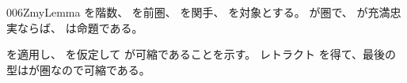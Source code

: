 \documentclass[index]{subfiles}
\begin{document}
\begin{myBlock}{006Z}{myLemma}
  を階数、
  を前圏、
  を関手、
  を対象とする。
  が圏で、
  が充満忠実ならば、
  は命題である。
\end{myBlock}
\StartDefiningTabulars
\begin{myProof}
  を適用し、
  を仮定して
  が可縮であることを示す。
  レトラクト
  を得て、最後の型はが圏なので可縮である。
\end{myProof}
\StopDefiningTabulars
\end{document}
